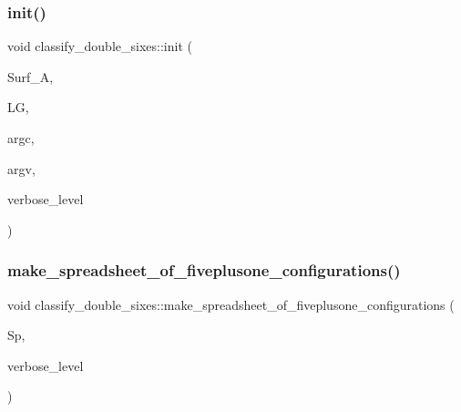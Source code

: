 \mbox{\label{classclassify__double__sixes_a8c5c41d5124b35379d626480ff225f7b}} 
\subsubsection{\texorpdfstring{init()}{init()}}
{\footnotesize\ttfamily void classify\+\_\+double\+\_\+sixes\+::init (\begin{DoxyParamCaption}\item[{\mbox{\hyperlink{classsurface__with__action}{surface\+\_\+with\+\_\+action}} $\ast$}]{Surf\+\_\+A,  }\item[{\mbox{\hyperlink{classlinear__group}{linear\+\_\+group}} $\ast$}]{LG,  }\item[{int}]{argc,  }\item[{const char $\ast$$\ast$}]{argv,  }\item[{\mbox{\hyperlink{galois_8h_a09fddde158a3a20bd2dcadb609de11dc}{I\+NT}}}]{verbose\+\_\+level }\end{DoxyParamCaption})}

\mbox{\label{classclassify__double__sixes_a6de01cd6f2d38e1187ae13a6d8ba10ef}} 
\subsubsection{\texorpdfstring{make\+\_\+spreadsheet\+\_\+of\+\_\+fiveplusone\+\_\+configurations()}{make\_spreadsheet\_of\_fiveplusone\_configurations()}}
{\footnotesize\ttfamily void classify\+\_\+double\+\_\+sixes\+::make\+\_\+spreadsheet\+\_\+of\+\_\+fiveplusone\+\_\+configurations (\begin{DoxyParamCaption}\item[{\mbox{\hyperlink{classspreadsheet}{spreadsheet}} $\ast$\&}]{Sp,  }\item[{\mbox{\hyperlink{galois_8h_a09fddde158a3a20bd2dcadb609de11dc}{I\+NT}}}]{verbose\+\_\+level }\end{DoxyParamCaption})}

